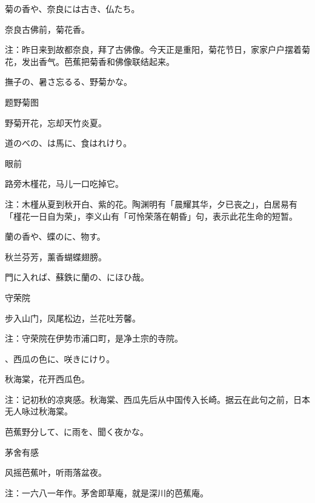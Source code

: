 \begin{haiku}
    {\FH 菊の香や、奈良には古き、仏たち。}

    {\FK 奈良古佛前，菊花香。}

    {\FT 注：昨日来到故都奈良，拜了古佛像。今天正是重阳，菊花节日，家家户户摆着菊花，发出香气。芭蕉把菊香和佛像联结起来。}
\end{haiku}

\begin{haiku}
    {\FH 撫子の、暑さ忘るる、野菊かな。}

    {\FK 题野菊图}

    {\FK 野菊开花，忘却天竹炎夏。}
\end{haiku}

\begin{haiku}
    {\FH 道のべの、は馬に、食はれけり。}

    {\FK 眼前}

    {\FK 路旁木槿花，马儿一口吃掉它。}

    {\FT 注：木槿从夏到秋开白、紫的花。陶渊明有「晨耀其华，夕已丧之」，白居易有「槿花一日自为荣」，李义山有「可怜荣落在朝昏」句，表示此花生命的短暂。}
\end{haiku}

\begin{haiku}
    {\FH 蘭の香や、蝶のに、物す。}

    {\FK 秋兰芬芳，薰香蝴蝶翅膀。}
\end{haiku}

\begin{haiku}
    {\FH 門に入れば、蘇鉄に蘭の、にほひ哉。}

    {\FK 守荣院}

    {\FK 步入山门，凤尾松边，兰花吐芳馨。}

    {\FT 注：守荣院在伊势市浦口町，是净土宗的寺院。}
\end{haiku}

\begin{haiku}
    {\FH {}、西瓜の色に、咲きにけり。}

    {\FK 秋海棠，花开西瓜色。}

    {\FT 注：记初秋的凉爽感。秋海棠、西瓜先后从中国传入长崎。据云在此句之前，日本无人咏过秋海棠。}
\end{haiku}

\begin{haiku}
    {\FH 芭蕉野分して、に雨を、聞く夜かな。}

    {\FK 茅舍有感}

    {\FK 风摇芭蕉叶，听雨落盆夜。}

    {\FT 注：一六八一年作。茅舍即草庵，就是深川的芭蕉庵。}
\end{haiku}

